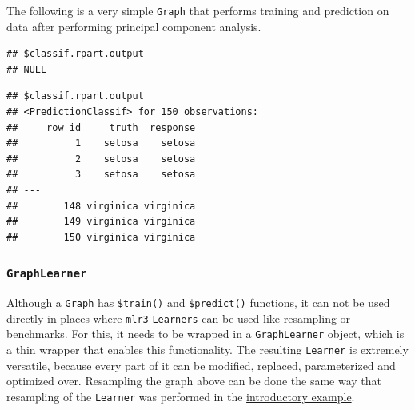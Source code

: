 \documentclass[]{scrbook}
\newenvironment{Shaded}{\begin{snugshade}}{\end{snugshade}}
\newcommand{\KeywordTok}[1]{\textcolor[rgb]{0.13,0.29,0.53}{\textbf{#1}}}
\newcommand{\NormalTok}[1]{#1}
\newcommand{\OperatorTok}[1]{\textcolor[rgb]{0.81,0.36,0.00}{\textbf{#1}}}
\newcommand{\StringTok}[1]{\textcolor[rgb]{0.31,0.60,0.02}{#1}}
\renewenvironment{Shaded} {\begin{snugshade}\small} {\end{snugshade}}
\begin{document}
The following is a very simple \texttt{Graph} that performs training and prediction on data after performing principal component analysis.

\begin{Shaded}
\end{Shaded}

\begin{Shaded}
\end{Shaded}

\begin{verbatim}
## $classif.rpart.output
## NULL
\end{verbatim}

\begin{Shaded}
\end{Shaded}

\begin{verbatim}
## $classif.rpart.output
## <PredictionClassif> for 150 observations:
##     row_id     truth  response
##          1    setosa    setosa
##          2    setosa    setosa
##          3    setosa    setosa
## ---                           
##        148 virginica virginica
##        149 virginica virginica
##        150 virginica virginica
\end{verbatim}

\hypertarget{graphlearner}{%
\subsubsection{\texorpdfstring{\texttt{GraphLearner}}{GraphLearner}}\label{graphlearner}}

Although a \texttt{Graph} has \texttt{\$train()} and \texttt{\$predict()} functions, it can not be used directly in places where \texttt{mlr3} \texttt{Learners} can be used like resampling or benchmarks.
For this, it needs to be wrapped in a \texttt{GraphLearner} object, which is a thin wrapper that enables this functionality.
The resulting \texttt{Learner} is extremely versatile, because every part of it can be modified, replaced, parameterized and optimized over.
Resampling the graph above can be done the same way that resampling of the \texttt{Learner} was performed in the \protect\hyperlink{whats-the-point}{introductory example}.
\end{document}
